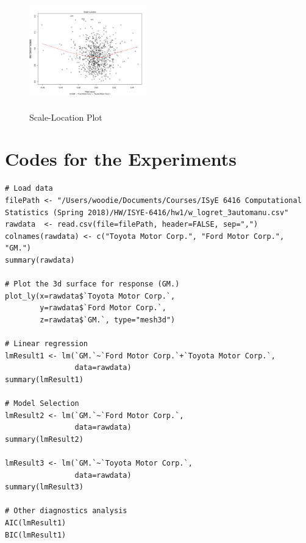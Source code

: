 \begin{figure}[h!]
\includegraphics[height=2in, width=2in]{scale-location}
\caption{Scale-Location Plot}
\label{img:slplot}
\end{figure}

\appendix
\section{Codes for the Experiments}
\begin{lstlisting}
# Load data
filePath <- "/Users/woodie/Documents/Courses/ISyE 6416 Computational Statistics (Spring 2018)/HW/ISYE-6416/hw1/w_logret_3automanu.csv"
rawdata  <- read.csv(file=filePath, header=FALSE, sep=",")
colnames(rawdata) <- c("Toyota Motor Corp.", "Ford Motor Corp.", "GM.")
summary(rawdata)

# Plot the 3d surface for response (GM.)
plot_ly(x=rawdata$`Toyota Motor Corp.`,
        y=rawdata$`Ford Motor Corp.`,
        z=rawdata$`GM.`, type="mesh3d")

# Linear regression
lmResult1 <- lm(`GM.`~`Ford Motor Corp.`+`Toyota Motor Corp.`,
                data=rawdata)                                  
summary(lmResult1)

# Model Selection
lmResult2 <- lm(`GM.`~`Ford Motor Corp.`,
                data=rawdata)              
summary(lmResult2)

lmResult3 <- lm(`GM.`~`Toyota Motor Corp.`,
                data=rawdata)                
summary(lmResult3)

# Other diagnostics analysis
AIC(lmResult1)
BIC(lmResult1)
\end{lstlisting}



